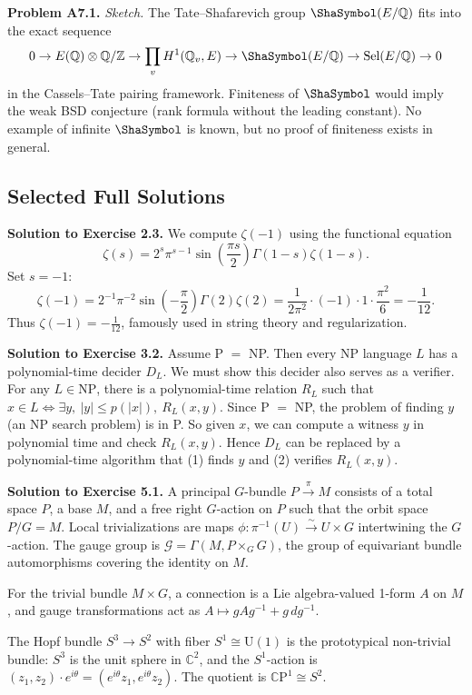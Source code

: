 \medskip\noindent\textbf{Problem A7.1.} \textit{Sketch.} The Tate--Shafarevich group $\Sha(E/\mathbb{Q})$ fits into the exact sequence
\[
0 \to E(\mathbb{Q}) \otimes \mathbb{Q}/\mathbb{Z} \to \prod_v H^1(\mathbb{Q}_v, E) \to \Sha(E/\mathbb{Q}) \to \text{Sel}(E/\mathbb{Q}) \to 0
\]
in the Cassels--Tate pairing framework. Finiteness of $\Sha$ would imply the weak BSD conjecture (rank formula without the leading constant). No example of infinite $\Sha$ is known, but no proof of finiteness exists in general.

\subsection{Selected Full Solutions}

\begin{solution}
\textbf{Solution to Exercise 2.3.}
We compute $\zeta(-1)$ using the functional equation
\[
\zeta(s) = 2^s \pi^{s-1} \sin\!\left(\frac{\pi s}{2}\right) \Gamma(1-s) \zeta(1-s).
\]
Set $s = -1$:
\[
\zeta(-1) = 2^{-1} \pi^{-2} \sin\!\left(-\frac{\pi}{2}\right) \Gamma(2) \zeta(2) = \frac{1}{2\pi^2} \cdot (-1) \cdot 1 \cdot \frac{\pi^2}{6} = -\frac{1}{12}.
\]
Thus $\zeta(-1) = -\tfrac{1}{12}$, famously used in string theory and regularization.
\end{solution}

\begin{solution}
\textbf{Solution to Exercise 3.2.}
Assume P $=$ NP. Then every NP language $L$ has a polynomial-time decider $D_L$. We must show this decider also serves as a verifier. For any $L \in \text{NP}$, there is a polynomial-time relation $R_L$ such that $x \in L \iff \exists y,\ |y| \leq p(|x|),\ R_L(x,y)$. Since P $=$ NP, the problem of finding $y$ (an NP search problem) is in P. So given $x$, we can compute a witness $y$ in polynomial time and check $R_L(x,y)$. Hence $D_L$ can be replaced by a polynomial-time algorithm that (1) finds $y$ and (2) verifies $R_L(x,y)$.
\end{solution}

\begin{solution}
\textbf{Solution to Exercise 5.1.}
A principal $G$-bundle $P \xrightarrow{\pi} M$ consists of a total space $P$, a base $M$, and a free right $G$-action on $P$ such that the orbit space $P/G = M$. Local trivializations are maps $\phi: \pi^{-1}(U) \xrightarrow{\sim} U \times G$ intertwining the $G$-action. The gauge group is $\mathcal{G} = \Gamma(M, P \times_G G)$, the group of equivariant bundle automorphisms covering the identity on $M$.

For the trivial bundle $M \times G$, a connection is a Lie algebra-valued 1-form $A$ on $M$, and gauge transformations act as $A \mapsto gAg^{-1} + g\, dg^{-1}$.

The Hopf bundle $S^3 \to S^2$ with fiber $S^1 \cong \text{U}(1)$ is the prototypical non-trivial bundle: $S^3$ is the unit sphere in $\mathbb{C}^2$, and the $S^1$-action is $(z_1, z_2) \cdot e^{i\theta} = (e^{i\theta} z_1, e^{i\theta} z_2)$. The quotient is $\mathbb{C}\text{P}^1 \cong S^2$.
\end{solution}

